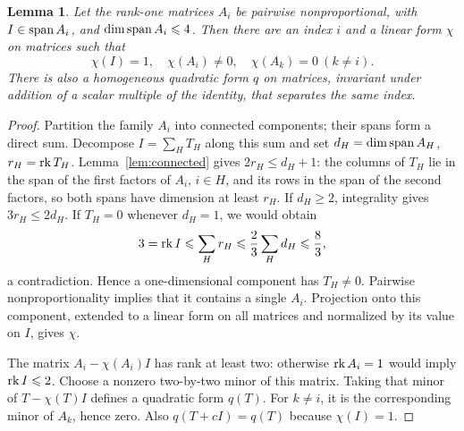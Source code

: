 \documentclass[11pt,a4paper]{article}
\numberwithin{equation}{section}
\theoremstyle{plain}
\newtheorem{lemma}[theorem]{Lemma}
\theoremstyle{definition}
\newcommand{\leqs}{\leqslant}\newcommand{\geqs}{\geqslant}
\begin{document}
\begin{lemma}\label{lem:separator}
Let the rank-one matrices $A_i$ be pairwise nonproportional, with
$I\in\operatorname{span} A_i$, and $\dim\Span A_i\leqs4$.
Then there are an index $i$ and a linear form $\chi$ on matrices such that
\[
 \chi(I)=1,\quad\chi(A_i)\ne0,\quad\chi(A_k)=0\ (k\ne i).
\]
There is also a homogeneous quadratic form $q$ on matrices, invariant
under addition of a scalar multiple of the identity, that separates
the same index.
\end{lemma}
\begin{proof}
Partition the family $A_i$ into connected components; their spans
form a direct sum. Decompose $I=\sum_H T_H$ along this sum and set
$d_H=\dim\operatorname{span} A_H$, $r_H=\operatorname{rk} T_H$.
Lemma~\ref{lem:connected} gives $2r_H\leqs d_H+1$: the columns of
$T_H$ lie in the span of the first factors of $A_i$, $i\in H$, and
its rows in the span of the second factors, so both spans have
dimension at least $r_H$.
If $d_H\geqs2$, integrality gives $3r_H\leqs2d_H$.
If $T_H=0$ whenever $d_H=1$, we would obtain
\[
 3=\rk I\leqs\sum_H r_H\leqs\frac23\sum_H d_H\leqs\frac83,
\]
a contradiction. Hence a one-dimensional component has $T_H\ne0$.
Pairwise nonproportionality implies that it contains a single $A_i$.
Projection onto this component, extended to a linear form on all
matrices and normalized by its value on $I$, gives $\chi$.

The matrix $A_i-\chi(A_i)I$ has rank at least two: otherwise
$\operatorname{rk} A_i=1$ would imply $\rk I\leqs2$.
Choose a nonzero two-by-two minor of this matrix. Taking that minor
of $T-\chi(T)I$ defines a quadratic form $q(T)$.
For $k\ne i$, it is the corresponding minor of $A_k$, hence zero.
Also $q(T+cI)=q(T)$ because $\chi(I)=1$.
\end{proof}
\end{document}
